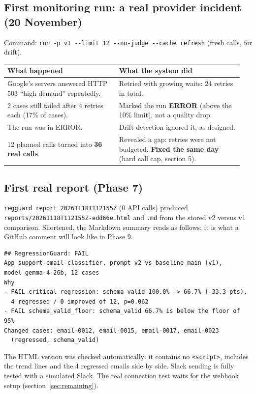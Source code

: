 \documentclass[11pt,a4paper]{article}
\newcommand{\code}[1]{\nolinkurl{#1}}
\begin{document}
\subsection{First monitoring run: a real provider incident (20 November)}

Command: \texttt{run -p v1 -{}-limit 12 -{}-no-judge -{}-cache refresh} (fresh calls, for drift).

\begin{longtable}{@{}p{0.45\linewidth}p{0.50\linewidth}@{}}
\toprule
\textbf{What happened} & \textbf{What the system did} \\
\midrule
\endhead
Google's servers answered HTTP 503 ``high demand'' repeatedly. & Retried with growing waits: 24 retries in total. \\
2 cases still failed after 4 retries each (17\% of cases). & Marked the run \textbf{ERROR} (above the 10\% limit), not a quality drop. \\
The run was in ERROR. & Drift detection ignored it, as designed. \\
12 planned calls turned into \textbf{36 real calls}. & Revealed a gap: retries were not budgeted. \textbf{Fixed the same day} (hard call cap, section 5). \\
\bottomrule
\end{longtable}

\subsection{First real report (Phase 7)}

\texttt{regguard report 20261118T112155Z} (0 API calls) produced
\code{reports/20261118T112155Z-edd66e.html} and \code{.md} from the stored v2 versus v1
comparison. Shortened, the Markdown summary reads as follows; it is what a GitHub comment will
look like in Phase 9.

\begin{Verbatim}[fontsize=\small,frame=single]
## RegressionGuard: FAIL
App support-email-classifier, prompt v2 vs baseline main (v1),
model gemma-4-26b, 12 cases
Why
- FAIL critical_regression: schema_valid 100.0% -> 66.7% (-33.3 pts),
  4 regressed / 0 improved of 12, p=0.062
- FAIL schema_valid_floor: schema_valid 66.7% is below the floor of 95%
Changed cases: email-0012, email-0015, email-0017, email-0023
  (regressed, schema_valid)
\end{Verbatim}

The HTML version was checked automatically: it contains no \texttt{<script>}, includes the
trend lines and the 4 regressed emails side by side. Slack sending is fully tested with a
simulated Slack. The real connection test waits for the webhook setup
(section~\ref{sec:remaining}).
\end{document}

